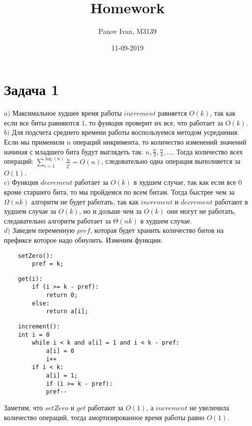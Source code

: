 \documentclass{article}
\title{Homework}
\date{11-09-2019}
\author{Panov Ivan, M3139}
\begin{document}
	
	\maketitle
	\newpage
	
	\section*{Задача 1}
	$a)$ Максимальное худшее время работы $increment$ равняется $O(k)$, так как если все биты равняются $1$, то функция проверит их все, что работает за $O(k)$.
	\\
	$b)$ Для подсчета среднего времени работы воспользуемся методом усреднения. Если мы применили $n$ операций инкримента, то количество изменений значений начиная с младшего бита будут выглядеть так: $n, \frac{n}{2}, \frac{n}{4}, ...$. Тогда количество всех операций: $\sum_{i = 1}^{\log(n)}\frac{n}{2^i} = O(n)$, следовательно одна операция выполняется за $O(1)$.
	\\
	$c)$ Функция $decrement$ работает за $O(k)$ в худшем случае, так как если все $0$ кроме старшего бита, то мы пройдемся по всем битам. Тогда быстрее чем за $\Omega(nk)$ алгоритм не будет работать, так как $increment$ и $decrement$ работают в худшем случае за $O(k)$, но и дольше чем за $O(k)$ они могут не работать, следавательно алгоритм работает за $\Theta(nk)$ в худшем случае.
	\\
	$d)$ Заведем переменную $pref$, которая будет хранить количество битов на префиксе которое надо обнулить. Изменим функции:
	\begin{verbatim}
	setZero():
	    pref = k;
	\end{verbatim}
	\begin{verbatim}
	get(i):
	    if (i >= k - pref):
	        return 0;
	    else:
	        return a[i];
	\end{verbatim}
	\begin{verbatim}
	increment():
	int i = 0
	    while i < k and a[i] = 1 and i < k - pref:
	        a[i] = 0
	        i++
	    if i < k:
	        a[i] = 1;
	        if (i >= k - pref):
	        pref--
	\end{verbatim}
	Заметим, что $setZero$ и $get$ работают за $O(1)$, а $increment$ не увеличила количество операций, тогда амортизированное время работы равно $O(1)$.
	\\
	\\
	\\
	\\
	
\end{document}

